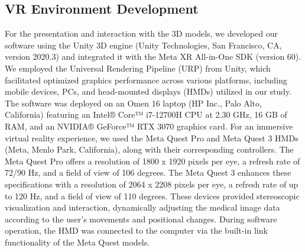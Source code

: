 \documentclass{bmcart}
\begin{document}
\subsection{VR Environment Development}
For the presentation and interaction with the 3D models, we developed our software using the Unity 3D engine (Unity Technologies, San Francisco, CA, version 2020.3) and integrated it with the Meta XR All-in-One SDK (version 60). We employed the Universal Rendering Pipeline (URP) from Unity, which facilitated optimized graphics performance across various platforms, including mobile devices, PCs, and head-mounted displays (HMDs) utilized in our study.
The software was deployed on an Omen 16 laptop (HP Inc., Palo Alto, California) featuring an Intel® Core™ i7-12700H CPU at 2.30 GHz, 16 GB of RAM, and an NVIDIA® GeForce™ RTX 3070 graphics card. For an immersive virtual reality experience, we used the Meta Quest Pro and Meta Quest 3 HMDs (Meta, Menlo Park, California), along with their corresponding controllers. The Meta Quest Pro offers a resolution of 1800 x 1920 pixels per eye, a refresh rate of 72/90 Hz, and a field of view of 106 degrees. The Meta Quest 3 enhances these specifications with a resolution of 2064 x 2208 pixels per eye, a refresh rate of up to 120 Hz, and a field of view of 110 degrees. These devices provided stereoscopic visualization and interaction, dynamically adjusting the medical image data according to the user's movements and positional changes. During software operation, the HMD was connected to the computer via the built-in link functionality of the Meta Quest models.
\end{document}
